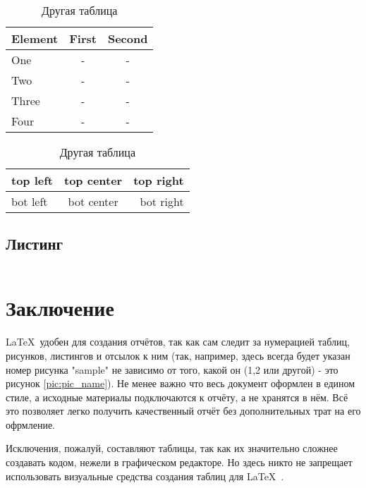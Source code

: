\begin{table}[H]
	\caption{Одна таблица}
	\begin{center}
		\begin{tabular*}{0.4\textwidth}{@{\extracolsep{\fill} } lcc}
			\toprule
			Element & First & Second \\
			\midrule
			One       & -    & -    \\
			Two       & -    & -    \\
			Three     & -    & -    \\
			Four      & -    & -    \\
			\bottomrule
		\end{tabular*}
		\label{tabular:tab_examp_1}
	\end{center}

	\caption{Другая таблица}
	\begin{center}
		\begin{tabular}{|l|c|r|}
			\hline
			top left & top center & top right \\ \hline
			bot left & bot center & bot right \\ \hline
		\end{tabular}
		\label{tabular:tab_examp_2}
	\end{center}
\end{table}


\newpage
\subsection{Листинг}
\begin{code}
	\inputminted[breaklines=true, xleftmargin=1em, linenos, frame=single, framesep=10pt, fontsize=\footnotesize, firstline=1, lastline=33]{haskell}{listings/script.bash}
	\caption{Script.bash – bash в массы!}
\end{code}

\newpage
\section*{Заключение}
\LaTeX\ удобен для создания отчётов, так как сам следит за нумерацией таблиц, рисунков, листингов и отсылок к ним (так, например, здесь всегда будет указан номер рисунка "sample" не зависимо от того, какой он (1,2 или другой) - это рисунок \ref{pic:pic_name}). Не менее важно что весь документ оформлен в едином стиле, а исходные материалы подключаются к отчёту, а не хранятся в нём. Всё это позволяет легко получить качественный отчёт без дополнительных трат на его офрмление.

Исключения, пожалуй, составляют таблицы, так как их значительно сложнее создавать кодом, нежели в графическом редакторе. Но здесь никто не запрещает использовать визуальные средства создания таблиц для \LaTeX\ .
